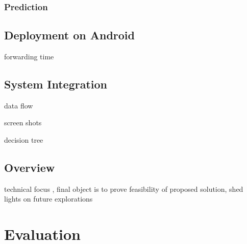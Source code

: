 \subsubsection{Prediction}




\subsection{Deployment on Android}

forwarding time

\subsection{System Integration}

data flow

screen shots

decision tree



\subsection{Overview}
technical focus , final object is to prove feasibility of proposed solution, shed lights on future explorations

\section{Evaluation}


\newpage
